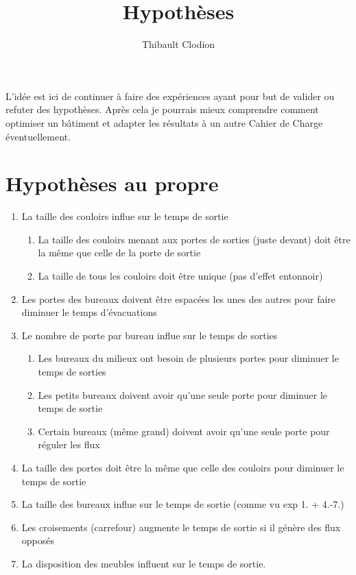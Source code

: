 \documentclass[12pt]{article}
\title{Hypothèses}
\author{Thibault Clodion}
\begin{document}
\maketitle %

L'idée est ici de continuer à faire des expériences ayant pour but de valider ou refuter des hypothèses.
Après cela je pourrais mieux comprendre comment optimiser un bâtiment et adapter les résultats à un autre Cahier de Charge éventuellement.

\section{Hypothèses au propre}

\begin{enumerate}
    \item La taille des couloirs influe sur le temps de sortie
    \begin{enumerate}
        \item La taille des couloirs menant aux portes de sorties (juste devant) doit être la même que celle de la porte de sortie
        \item La taille de tous les couloirs doit être unique (pas d'effet entonnoir)
    \end{enumerate}

    \item Les portes des bureaux doivent être espacées les unes des autres pour faire diminuer le temps d'évacuations

    \item Le nombre de porte par bureau influe sur le temps de sorties
    \begin{enumerate}
        \item Les bureaux du milieux ont besoin de plusieurs portes pour diminuer le temps de sorties
        \item Les petits bureaux doivent avoir qu'une seule porte pour diminuer le temps de sortie
        \item Certain bureaux (même grand) doivent avoir qu'une seule porte pour réguler les flux
    \end{enumerate}

    \item La taille des portes doit être la même que celle des couloirs pour diminuer le temps de sortie


    \item La taille des bureaux influe sur le temps de sortie (comme vu exp 1. + 4.-7.)
    
    \item Les croisements (carrefour) augmente le temps de sortie si il génère des flux opposés
    
    \item La disposition des meubles influent sur le temps de sortie.

\end{enumerate}
\end{document}
